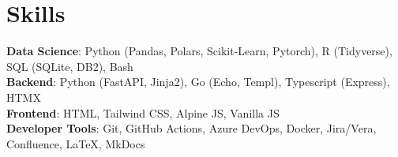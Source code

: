 \section{Skills}

\begin{itemize}[leftmargin=0.15in, label={}]
    \small{\item{
                    \textbf{Data Science}{: Python (Pandas, Polars, Scikit-Learn, Pytorch), R (Tidyverse), SQL (SQLite, DB2), Bash } \\
                    \textbf{Backend}{: Python (FastAPI, Jinja2), Go (Echo, Templ), Typescript (Express), HTMX } \\
                    \textbf{Frontend}{: HTML, Tailwind CSS, Alpine JS, Vanilla JS } \\
                    \textbf{Developer Tools}{: Git, GitHub Actions, Azure DevOps, Docker, Jira/Vera, Confluence, LaTeX, MkDocs} \\
              }}
\end{itemize}
